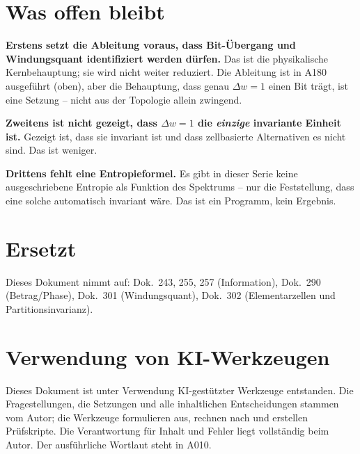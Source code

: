 \section{Was offen bleibt}

\textbf{Erstens setzt die Ableitung voraus, dass Bit-Übergang und Windungsquant
identifiziert werden dürfen.} Das ist die physikalische Kernbehauptung; sie wird
nicht weiter reduziert. Die Ableitung ist in A180 ausgeführt (oben), aber die
Behauptung, dass genau $\Delta w=1$ einen Bit trägt, ist eine Setzung -- nicht
aus der Topologie allein zwingend.

\textbf{Zweitens ist nicht gezeigt, dass $\Delta w=1$ die \emph{einzige}
invariante Einheit ist.} Gezeigt ist, dass sie invariant ist und dass
zellbasierte Alternativen es nicht sind. Das ist weniger.

\textbf{Drittens fehlt eine Entropieformel.} Es gibt in dieser Serie keine
ausgeschriebene Entropie als Funktion des Spektrums -- nur die Feststellung, dass
eine solche automatisch invariant wäre. Das ist ein Programm, kein Ergebnis.

\section{Ersetzt}

Dieses Dokument nimmt auf: Dok.~243, 255, 257 (Information), Dok.~290
(Betrag/Phase), Dok.~301 (Windungsquant), Dok.~302 (Elementarzellen und
Partitionsinvarianz).

\section{Verwendung von KI-Werkzeugen}

Dieses Dokument ist unter Verwendung KI-gestützter Werkzeuge entstanden. Die
Fragestellungen, die Setzungen und alle inhaltlichen Entscheidungen stammen vom
Autor; die Werkzeuge formulieren aus, rechnen nach und erstellen Prüfskripte.
Die Verantwortung für Inhalt und Fehler liegt vollständig beim Autor. Der
ausführliche Wortlaut steht in A010.
